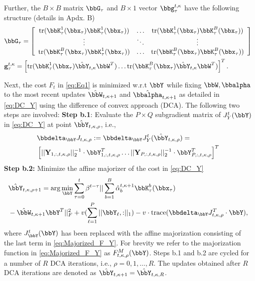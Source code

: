 \documentclass[10pt,final]{IEEEtran}
\begin{document}
Further, the $B\times B$ matrix $\bbG_{\tau}$ and $B\times 1$ vector $\bbg_{\tau}^{t,\kappa}$ have the following structure (details in Apdx. B)
\begin{align}\label{eq:G_and_g}
&\bbG_{\tau} = \left[\begin{array}{ccc}\textrm{tr}({\bbK}_{\tau}^1(\bbx_{\tau}){\bbK}_{\tau}^1(\bbx_{\tau})) &\ldots &\textrm{tr}({\bbK}_{\tau}^1(\bbx_{\tau}){\bbK}_{\tau}^B(\bbx_{\tau}))\\
\vdots &\ddots &\vdots\\
\textrm{tr}({\bbK}_{\tau}^B(\bbx_{\tau}){\bbK}_{\tau}^1(\bbx_{\tau})) & \ldots & \textrm{tr}({\bbK}_{\tau}^B(\bbx_{\tau}){\bbK}_{\tau}^B(\bbx_{\tau}))\end{array}\right]\nonumber\\
&\mathbf{g}_{\tau}^{t,\kappa} = \left[\textrm{tr}({\bbK}_{\tau}^1(\bbx_{\tau})\hat{\bbY}_{t,\kappa}\bbW^T)\ldots
\textrm{tr}({\bbK}_{\tau}^B(\bbx_{\tau})\hat{\bbY}_{t,\kappa}\bbW^T)\right]^T.\hspace{-0.6cm}
\end{align}

Next,  the cost $F_t$ in \eqref{eq:Eq1} is minimized w.r.t  $\bbY$ while fixing $\bbW,\bbalpha$ to the most recent updates $\hat{\bbW}_{t,\kappa+1}$ and $\hat{\bbalpha}_{t,\kappa+1}$
as detailed in \eqref{eq:DC_Y} using the difference of convex approach (DCA). The following two steps are involved:
\newline
\textbf{Step b.1}: Evaluate the $P\times Q$ subgradient  matrix of $J_{Y}^t(\bbY)$ in \eqref{eq:DC_Y} at point $\hat{\bbY}_{t,\kappa,\rho}$, i.e.,
\begin{align}\label{eq:Subgradient_Y}
&\bbdelta_{\bbY} J_{t,\kappa,\rho}:=\bbdelta_{\bbY} J_{Y}^t(\hat{\bbY}_{t,\kappa,\rho})=\\
&
\left[{{||\mathbf{Y}_{1,:,t,\kappa,\rho}||_2^{-1}}\cdot\bbY_{1,:,t,\kappa,\rho}^T}
\ldots{||\mathbf{Y}_{P,:,t,\kappa,\rho}||_2^{-1}}\cdot\bbY_{P,:,t,\kappa,\rho}^T
\right]^T\nonumber
\end{align}
\textbf{Step b.2:} Minimize the affine majorizer of the cost  in \eqref{eq:DC_Y}
\begin{align}\label{eq:Majorized_F_Y}
&\hat{\bbY}_{t,\kappa,\rho+1}  
=    \arg\min_{\bbY}
\sum_{\tau=0}^{t}\beta^{t-\tau}||\sum_{b=1}^{B}\hat{\alpha}_{b}^{t,\kappa+1} \bbK_{\tau}^b(\bbx_{\tau})\\&-\hat{\bbW}_{t,\kappa+1}{\bbY}^T||_F^2
+v(\sum_{\ell=1}^{P}||{\bbY_{\ell},:}||_1)- v\cdot \textrm{trace}(\bbdelta_{\bbY} J_{t,\kappa,\rho}^T\cdot \bbY),\nonumber
\end{align}
where $J_{\bbY}^t(\bbY)$ has been replaced with the affine majorization consisting of the last term in \eqref{eq:Majorized_F_Y}. For brevity we refer to the majorization function in \eqref{eq:Majorized_F_Y} as $F_{t,\kappa,\rho}^M(\bbY)$. Steps b.1 and b.2 are cycled for a number of $R$ DCA iterations, i.e., $\rho=0,1,\ldots,R$. 
The updates obtained after $R$ DCA iterations are denoted as
$\hat{\bbY}_{t,\kappa+1}=\hat{\bbY}_{t,\kappa,R}$.
\end{document}
